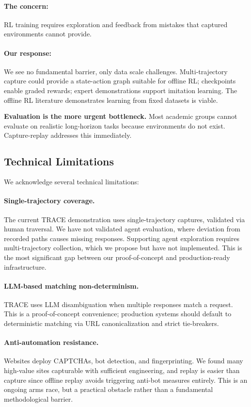 \documentclass[letterpaper]{article}
\begin{document}
\paragraph{The concern:} RL training requires exploration and feedback from mistakes that captured environments cannot provide.

\paragraph{Our response:} We see no fundamental barrier, only data scale challenges. Multi-trajectory capture could provide a state-action graph suitable for offline RL; checkpoints enable graded rewards; expert demonstrations support imitation learning. The offline RL literature demonstrates learning from fixed datasets is viable.

\textbf{Evaluation is the more urgent bottleneck.} Most academic groups cannot evaluate on realistic long-horizon tasks because environments do not exist. Capture-replay addresses this immediately.

\subsection{Technical Limitations}

We acknowledge several technical limitations:

\paragraph{Single-trajectory coverage.} The current TRACE demonstration uses single-trajectory captures, validated via human traversal. We have not validated agent evaluation, where deviation from recorded paths causes missing responses. Supporting agent exploration requires multi-trajectory collection, which we propose but have not implemented. This is the most significant gap between our proof-of-concept and production-ready infrastructure.

\paragraph{LLM-based matching non-determinism.} TRACE uses LLM disambiguation when multiple responses match a request. This is a proof-of-concept convenience; production systems should default to deterministic matching via URL canonicalization and strict tie-breakers.

\paragraph{Anti-automation resistance.} Websites deploy CAPTCHAs, bot detection, and fingerprinting. We found many high-value sites capturable with sufficient engineering, and replay is easier than capture since offline replay avoids triggering anti-bot measures entirely. This is an ongoing arms race, but a practical obstacle rather than a fundamental methodological barrier.
\end{document}
